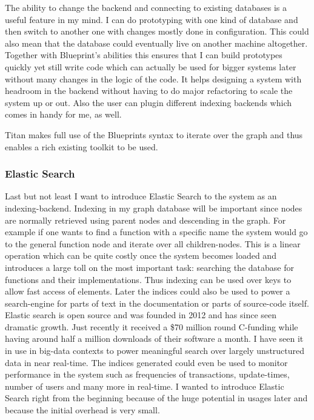 \documentclass[twoside, 11pt]{scrartcl}
\begin{document}
The ability to change the backend and connecting to existing databases is a useful feature in my mind. I can do prototyping with one kind of database and then switch to another one with changes mostly done in configuration. This could also mean that the database  could eventually live on another machine altogether. Together with Blueprint's abilities this ensures that I can build prototypes quickly yet still write code which can actually be used for bigger systems later without many changes in the logic of the code. It helps designing a system with headroom in the backend without having to do major refactoring to scale the system up or out. Also the user can plugin different indexing backends which comes in handy for me, as well.

Titan makes full use of the Blueprints syntax to iterate over the graph and thus enables a rich existing toolkit to be used.

\subsubsection{Elastic Search}
Last but not least I want to introduce Elastic Search to the system as an indexing-backend. Indexing in my graph database will be important since nodes are normally retrieved using parent nodes and descending in the graph. For example if one wants to find a function with a specific name the system would go to the general function node and iterate over all children-nodes. This is a linear operation which can be quite costly once the system becomes loaded and introduces a large toll on the most important task: searching the database for functions and their implementations. Thus indexing can be used over keys to allow fast access of elements. Later the indices could also be used to power a search-engine for parts of text in the documentation or parts of source-code itself.
Elastic search is open source and was founded in 2012 and has since seen dramatic growth. Just recently it received a \$70 million round C-funding while having around half a million downloads of their software a month. \cite{link:esAbout} \cite{link:esTechCrunch} I have seen it in use in big-data contexts to power meaningful search over largely unstructured data in near real-time. The indices generated could even be used to monitor performance in the system such as frequencies of transactions, update-times, number of users and many more in real-time. I wanted to introduce Elastic Search right from the beginning because of the huge potential in usages later and because the initial overhead is very small.
\end{document}
